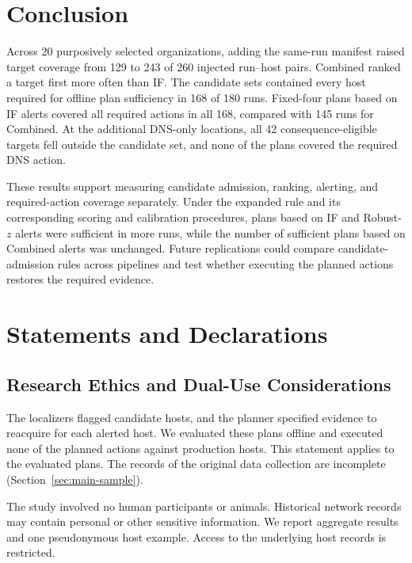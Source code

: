 \documentclass[sn-basic]{sn-jnl}%
\theoremstyle{thmstyleone}%
\theoremstyle{thmstyletwo}%
\theoremstyle{thmstylethree}%
\begin{document}
\section{Conclusion}\label{sec:conclusion}

Across 20 purposively selected organizations, adding the same-run manifest raised target coverage from 129 to 243 of 260 injected run--host pairs. Combined ranked a target first more often than IF. The candidate sets contained every host required for offline plan sufficiency in 168 of 180 runs. Fixed-four plans based on IF alerts covered all required actions in all 168, compared with 145 runs for Combined. At the additional DNS-only locations, all 42 consequence-eligible targets fell outside the candidate set, and none of the plans covered the required DNS action.

These results support measuring candidate admission, ranking, alerting, and required-action coverage separately. Under the expanded rule and its corresponding scoring and calibration procedures, plans based on IF and Robust-\(z\) alerts were sufficient in more runs, while the number of sufficient plans based on Combined alerts was unchanged. Future replications could compare candidate-admission rules across pipelines and test whether executing the planned actions restores the required evidence.

\backmatter

\section*{Statements and Declarations}

\subsection*{Research Ethics and Dual-Use Considerations}

The localizers flagged candidate hosts, and the planner specified evidence to reacquire for each alerted host. We evaluated these plans offline and executed none of the planned actions against production hosts. This statement applies to the evaluated plans. The records of the original data collection are incomplete (Section~\ref{sec:main-sample}).

The study involved no human participants or animals. Historical network records may contain personal or other sensitive information. We report aggregate results and one pseudonymous host example. Access to the underlying host records is restricted.
\end{document}
